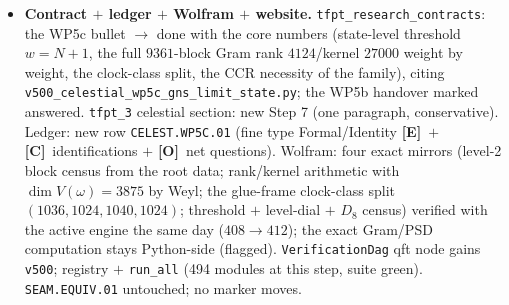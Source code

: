 \documentclass[11pt]{article}
\providecommand{\mE}{\textbf{[E]}}\providecommand{\mC}{\textbf{[C]}}
\providecommand{\mO}{\textbf{[O]}}\providecommand{\mX}{\textbf{[X]}}
\begin{document}
\begin{itemize}[leftmargin=1.5em]
$c>0$ positivity forces $\omega(bb^*)\ge c$ --- no $w$-uniform damping state exists, the family
formulation is \emph{necessary} and the family \emph{exists}: the preregistered KILL is probed and
not triggered. \mC\ quasi-free extension to the full $*$-algebra; Kac positivity beyond level $2$.
\mO\ local normality, net structure/Haag duality (WP5d), Costello--Li (WP5e).
\item \textbf{Contract $+$ ledger $+$ Wolfram $+$ website.} \texttt{tfpt\_research\_contracts}: the
WP5c bullet $\to$ done with the core numbers (state-level threshold $w=N{+}1$, the full
$9361$-block Gram rank $4124$/kernel $27000$ weight by weight, the clock-class split, the CCR
necessity of the family), citing \texttt{v500\_celestial\_wp5c\_gns\_limit\_state.py}; the WP5b
handover marked answered. \texttt{tfpt\_3} celestial section: new Step 7 (one paragraph,
conservative). Ledger: new row \texttt{CELEST.WP5C.01} (fine type Formal/Identity \mE\ $+$ \mC\
identifications $+$ \mO\ net questions). Wolfram: four exact mirrors (level-2 block census from the
root data; rank/kernel arithmetic with $\dim V(\omega)=3875$ by Weyl; the glue-frame clock-class
split $(1036,1024,1040,1024)$; threshold $+$ level-dial $+$ $D_8$ census) verified with the active
engine the same day ($408\to412$); the exact Gram/PSD computation stays Python-side (flagged).
\texttt{VerificationDag} qft node gains \texttt{v500}; registry $+$ \texttt{run\_all} (494 modules
at this step, suite green). \texttt{SEAM.EQUIV.01} untouched; no marker moves.
\end{itemize}
\end{document}
